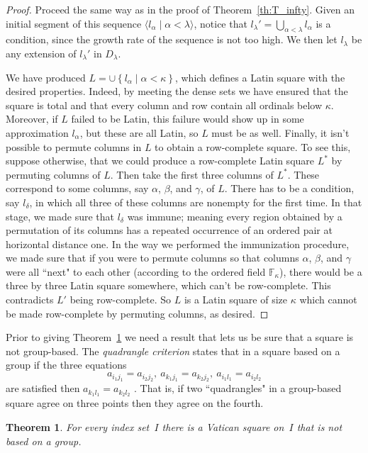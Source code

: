 \documentclass[12pt,a4paper]{article}
\newtheorem{thm}{Theorem}[section]
\newcommand{\F}{\mathbb{F}}
\newcommand{\st}{\; | \;}
\newcommand{\set}[2]{\left\{#1\st #2 \right\}}
\newcommand{\seq}[2]{\langle #1 \st #2 \rangle}
\begin{document}
\begin{proof}
Proceed the same way as in the proof of Theorem~\ref{th:T_infty}. Given an initial segment of this sequence $\seq{l_\alpha}{\alpha<\lambda}$, notice that $l_\lambda'=\bigcup_{\alpha<\lambda}l_\alpha$ is a condition, since the growth rate of the sequence is not too high. We then let $l_\lambda$ be any extension of $l_\lambda'$ in $D_\lambda$.

We have produced $L=\cup \set{l_\alpha}{\alpha<\kappa}$, which defines a Latin square with the desired properties. Indeed, by meeting the dense sets we have ensured that the square is total and that every column and row contain all ordinals below $\kappa$. Moreover, if $L$ failed to be Latin, this failure would show up in some approximation $l_\alpha$, but these are all Latin, so $L$ must be as well. Finally, it isn't possible to permute columns in $L$ to obtain a row-complete square. To see this, suppose otherwise, that we could produce a row-complete Latin square $L^*$ by permuting columns of $L$. Then take the first three columns of $L^*$. These correspond to some columns, say $\alpha$, $\beta$, and $\gamma$, of $L$. There has to be a condition, say $l_\delta$, in which all three of these columns are nonempty for the first time. In that stage, we made sure that $l_\delta$ was immune; meaning every region obtained by a permutation of its columns has a repeated occurrence of an ordered pair at horizontal distance one. In the way we performed the immunization procedure, we made sure that if you were to permute columns so that columns $\alpha$, $\beta$, and $\gamma$ were all ``next" to each other (according to the ordered field $\F_\kappa$), there would be a three by three Latin square somewhere, which can't be row-complete. This contradicts $L'$ being row-complete. So $L$ is a Latin square of size $\kappa$ which cannot be made row-complete by permuting columns, as desired.
\end{proof}



Prior to giving Theorem~\ref{th:infvat} we need a result that lets us be sure that a square is not group-based.  The {\em quadrangle criterion} states that in a square based on a group if the three equations
$$a_{i_1j_1} = a_{i_2j_2}, \ a_{k_1j_1} = a_{k_2j_2}, \ a_{i_1l_1} = a_{i_2l_2}$$
are satisfied then $a_{k_1l_1} = a_{k_2l_2}$ \cite[Theorem~1.2.1]{DK15}.  That is, if two ``quadrangles" in a group-based square agree on three points then they agree on the fourth.


\begin{thm}\label{th:infvat}
For every index set~$I$ %
there is a Vatican square on~$I$ that is not based on a  group.
\end{thm}
\end{document}

